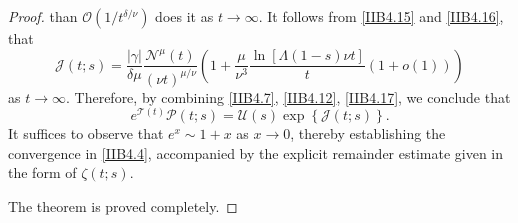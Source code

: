 \documentclass[10pt,a4paper]{amsart}
\begin{document}
\begin{proof}
    than $\mathcal{O}\left({1}/{t^{\delta/\nu}}\right)$ does it as $t\to\infty$. It follows from {\eqref{IIB4.15}}
    and {\eqref{IIB4.16}}, that
\begin{equation}                \label{IIB4.17}
    \mathcal{J}(t;s)=\frac{|\gamma|}{\delta\mu}\frac{{{\mathcal{N}}^{\mu}}(t)}{{(\nu{t})}^{{\mu}/{\nu}}}
    \left(1+\frac{\mu}{{\nu}^{3}}\frac{\ln\left[\Lambda(1-s)\nu{t}\right]}{t}\left(1+o(1)\right)\right)
\end{equation}
    as $t\to\infty$. Therefore, by combining {\eqref{IIB4.7}}, {\eqref{IIB4.12}}, {\eqref{IIB4.17}},
    we conclude that
\[
    {e^{\mathcal{T}(t)}}\mathcal{P}(t;s)=\mathcal{U}(s)\exp\left\{\mathcal{J}(t;s)\right\}.
\]
    It suffices to observe that ${e^x}\sim{1+x}$ as $x\to{0}$, thereby establishing the convergence
    in {\eqref{IIB4.4}}, accompanied by the explicit remainder estimate given in the form of $\zeta(t;s)$.

    The theorem is proved completely.
\end{proof}
\end{document}
